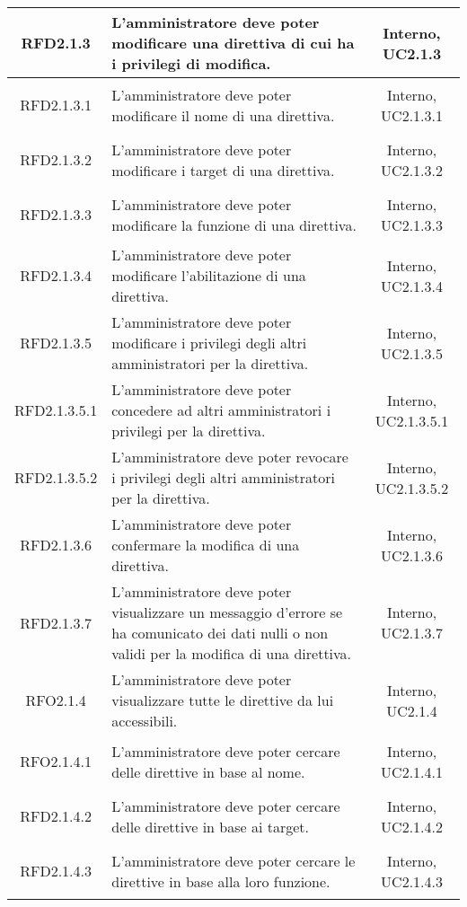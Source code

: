 \begin{longtable}{|c|>{\centering}m{7cm}|c|}
\hypertarget{RFD2.1.3}{RFD2.1.3} & L'amministratore deve poter modificare una direttiva di cui ha i privilegi di modifica. & Interno, UC2.1.3\\ \hline
\hypertarget{RFD2.1.3.1}{RFD2.1.3.1} & L'amministratore deve poter modificare il nome di una direttiva. & Interno, UC2.1.3.1\\ \hline
\hypertarget{RFD2.1.3.2}{RFD2.1.3.2} & L'amministratore deve poter modificare i target di una direttiva. & Interno, UC2.1.3.2\\ \hline
\hypertarget{RFD2.1.3.3}{RFD2.1.3.3} & L'amministratore deve poter modificare la funzione di una direttiva. & Interno, UC2.1.3.3\\ \hline
\hypertarget{RFD2.1.3.4}{RFD2.1.3.4} & L'amministratore deve poter modificare l'abilitazione di una direttiva. & Interno, UC2.1.3.4\\ \hline
\hypertarget{RFD2.1.3.5}{RFD2.1.3.5} & L'amministratore deve poter modificare i privilegi degli altri amministratori per la direttiva. & Interno, UC2.1.3.5\\ \hline
\hypertarget{RFD2.1.3.5.1}{RFD2.1.3.5.1} & L'amministratore deve poter concedere ad altri amministratori i privilegi per la direttiva. & Interno, UC2.1.3.5.1\\ \hline
\hypertarget{RFD2.1.3.5.2}{RFD2.1.3.5.2} & L'amministratore deve poter revocare i privilegi degli altri amministratori per la direttiva. & Interno, UC2.1.3.5.2\\ \hline
\hypertarget{RFD2.1.3.6}{RFD2.1.3.6} & L'amministratore deve poter confermare la modifica di una direttiva. & Interno, UC2.1.3.6\\ \hline
\hypertarget{RFD2.1.3.7}{RFD2.1.3.7} & L'amministratore deve poter visualizzare un messaggio d'errore se ha comunicato dei dati nulli o non validi per la modifica di una direttiva. & Interno, UC2.1.3.7\\ \hline
\hypertarget{RFO2.1.4}{RFO2.1.4} & L'amministratore deve poter visualizzare tutte le direttive da lui accessibili. & Interno, UC2.1.4\\ \hline
\hypertarget{RFO2.1.4.1}{RFO2.1.4.1} & L'amministratore deve poter cercare delle direttive in base al nome. & Interno, UC2.1.4.1\\ \hline
\hypertarget{RFD2.1.4.2}{RFD2.1.4.2} & L'amministratore deve poter cercare delle direttive in base ai target. & Interno, UC2.1.4.2\\ \hline
\hypertarget{RFD2.1.4.3}{RFD2.1.4.3} & L'amministratore deve poter cercare le direttive in base alla loro funzione. & Interno, UC2.1.4.3\\ \hline

\end{longtable}
